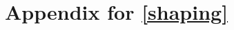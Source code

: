 
\graphicspath{ {\thisch/figures/} }

\chapter{Appendix for \autoref{shaping}}%
\label{appx:shaping}

\FloatBarrier%

\FloatBarrier%

\FloatBarrier%

